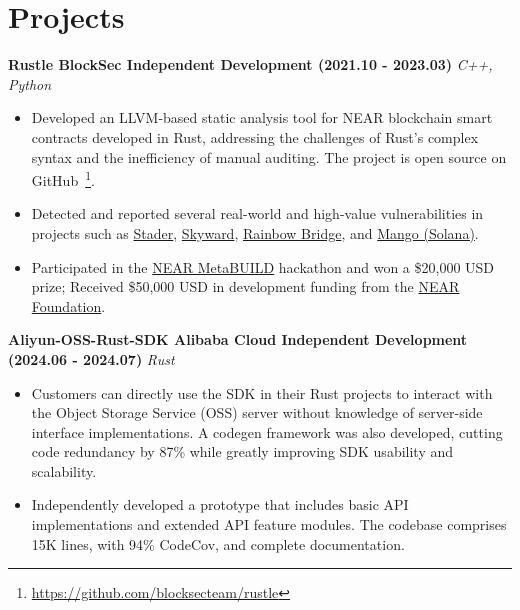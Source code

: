 \ifdefined\english

    \section*{Projects}

    \noindent\textbf{Rustle \textbar{} BlockSec \textbar{} Independent Development (2021.10 - 2023.03)} \hfill \textsl{C++, Python}

    \begin{itemize}
        \item Developed an LLVM-based static analysis tool for NEAR blockchain smart contracts developed in Rust, addressing the challenges of Rust's complex syntax and the inefficiency of manual auditing. The project is open source on GitHub~\footnote{\url{https://github.com/blocksecteam/rustle}}.
        \item Detected and reported several real-world and high-value vulnerabilities in projects such as \href{https://blog.staderlabs.com/stader-near-incident-report-08-16-2022-afe077ffd549}{Stader}, \href{https://coinculture.com/au/business/skyward-finance-reportedly-suffers-3m-exploit-on-near-protocol/}{Skyward}, \href{https://cryptopotato.com/defi-crisis-averted-near-protocols-rainbow-bridge-attacker-loses-2-5-eth/}{Rainbow Bridge}, and \href{https://blog.perp.fi/dissecting-the-mango-exploit-how-risk-is-mitigated-on-perp-v2-eccc91987c91}{Mango (Solana)}.
        \item Participated in the \href{https://devpost.com/software/rustle}{NEAR MetaBUILD} hackathon and won a \$20,000 USD prize; Received \$50,000 USD in development funding from the \href{https://near.foundation}{NEAR Foundation}.
    \end{itemize}

    \noindent\textbf{Aliyun-OSS-Rust-SDK \textbar{} Alibaba Cloud \textbar{} Independent Development (2024.06 - 2024.07)} \hfill \textsl{Rust}

    \begin{itemize}
        \item Customers can directly use the SDK in their Rust projects to interact with the Object Storage Service (OSS) server without knowledge of server-side interface implementations. A codegen framework was also developed, cutting code redundancy by 87\% while greatly improving SDK usability and scalability.
        \item Independently developed a prototype that includes basic API implementations and extended API feature modules. The codebase comprises 15K lines, with 94\% CodeCov, and complete documentation.
    \end{itemize}

